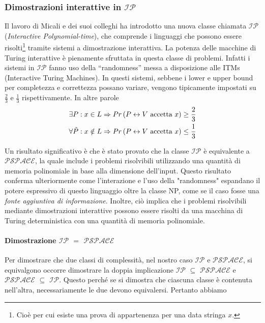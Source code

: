 \documentclass{article}
\theoremstyle{definition}
\begin{document}
\subsubsection{Dimostrazioni interattive in \texorpdfstring{\texttt{$\mathcal{IP}$}}{IP}}


Il lavoro di Micali e dei suoi colleghi ha introdotto una nuova classe chiamata \texttt{$\mathcal{IP}$} (\emph{Interactive Polynomial-time}), che comprende i linguaggi che possono essere risolti\footnote{Cioè per cui esiste una prova di appartenenza per una data stringa $x$.} tramite sistemi a dimostrazione interattiva.
La potenza delle macchine di Turing interattive è pienamente sfruttata in questa classe di problemi. Infatti i sistemi in \texttt{$\mathcal{IP}$} fanno uso della ``randomness'' messa a disposizione alle ITMs (Interactive Turing Machines).
In questi sistemi, sebbene i lower e upper bound per completezza e correttezza possano variare, vengono tipicamente impostati su $\frac{2}{3}$ e $\frac{1}{3}$ rispettivamente. In altre parole 
\begin{align*}
    &\exists P : x \in L \Rightarrow Pr\left(P \leftrightarrow V\text{ accetta } x\right) \geq \frac{2}{3} \\
    &\forall \Tilde{P} : x \notin L \Rightarrow Pr\left(P \leftrightarrow V \text{ accetta } x\right) \leq \frac{1}{3}
\end{align*}

Un risultato significativo è che è stato provato che la classe \texttt{$\mathcal{IP}$} è equivalente a \texttt{$\mathcal{PSPACE}$}, la quale include i problemi risolvibili utilizzando una quantità di memoria polinomiale in base alla dimensione dell'input. Questo risultato conferma ulteriormente come l'interazione e l'uso della "randomness" espandano il potere espressivo di questo linguaggio oltre la classe NP, come se il caso fosse una \emph{fonte aggiuntiva di informazione}.
 Inoltre, ciò implica che i problemi risolvibili mediante dimostrazioni interattive possono essere risolti da una macchina di Turing deterministica con una quantità di memoria polinomiale.



\paragraph{Dimostrazione \texorpdfstring{\texttt{$\mathcal{IP}$}}{IP} \texorpdfstring{$=$}{uguale} \texorpdfstring{\texttt{$\mathcal{PSPACE}$}}{PSPACE}}
Per dimostrare che due classi di complessità, nel nostro caso \texttt{$\mathcal{IP}$} e \texttt{$\mathcal{PSPACE}$}, si equivalgono occorre dimostrare la doppia implicazione 
\texttt{$\mathcal{IP}$} $\subseteq$ \texttt{$\mathcal{PSPACE}$} e \texttt{$\mathcal{PSPACE}$} $\subseteq$ \texttt{$\mathcal{IP}$}. Questo perché se si dimostra che ciascuna classe è contenuta nell'altra, necessariamente le due devono equivalersi. Pertanto abbiamo
\end{document}
